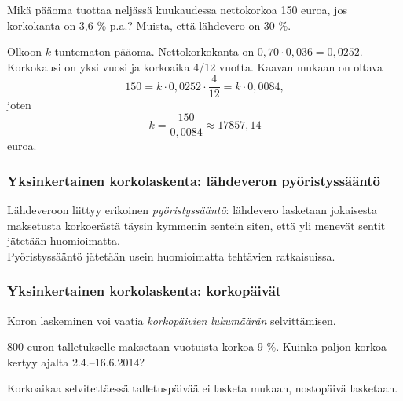 \documentclass{beamer}
\newcommand{\pblock}{\\ \vspace{0.5cm}\pause}
\begin{document}
\begin{frame}
    \begin{esim}
        Mikä pääoma tuottaa neljässä kuukaudessa nettokorkoa 150 euroa, jos korkokanta on 3{,}6 \% p.a.? Muista, että lähdevero on 30 \%.
    \end{esim}\pause
    \begin{ratkaisu}
        Olkoon \(k\) tuntematon pääoma. \pause Nettokorkokanta on \(0,70\cdot0,036 = 0,0252\).
        \pause Korkokausi on yksi vuosi ja korkoaika 4/12 vuotta.
        \pause Kaavan mukaan on oltava
        \[
            150 = k\cdot 0,0252\cdot \frac{4}{12} = k\cdot 0,0084,
        \]
        \pause
        joten
        \[
            k = \frac{150}{0,0084}\approx 17857,14
        \]
        euroa.
    \end{ratkaisu}
\end{frame}

\begin{frame}
    \frametitle{Yksinkertainen korkolaskenta: lähdeveron pyöristyssääntö}
    \pause
    \pause
    Lähdeveroon liittyy erikoinen \emph{pyöristyssääntö}:
    lähdevero lasketaan jokaisesta maksetusta korkoerästä täysin kymmenin sentein siten,
    että yli menevät sentit jätetään huomioimatta.
    \pblock
    Pyöristyssääntö jätetään usein huomioimatta tehtävien ratkaisuissa.
\end{frame}

\begin{frame}
    \frametitle{Yksinkertainen korkolaskenta: korkopäivät}
    \pause
    Koron laskeminen voi vaatia \emph{korkopäivien lukumäärän} selvittämisen.
    \pause
    \begin{esim}
        800 euron talletukselle maksetaan vuotuista korkoa 9 \%. Kuinka paljon korkoa kertyy ajalta 2.4.--16.6.2014?
    \end{esim}
    \pause
    Korkoaikaa selvitettäessä talletuspäivää ei lasketa mukaan, nostopäivä lasketaan.
\end{frame}
\end{document}

